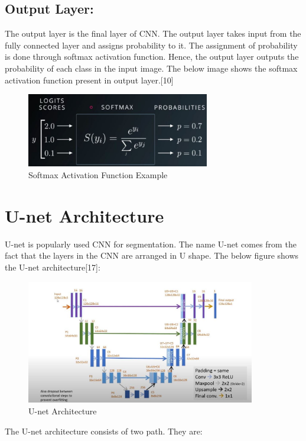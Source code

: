 \documentclass{IEEEtran}
\begin{document}
\subsection{\textbf{Output Layer:}}
The output layer is the final layer of CNN. The output layer takes input from the fully connected layer and assigns probability to it. The assignment of probability is done through softmax activation function. Hence, the output layer outputs the probability of each class in the input image. The below image shows the softmax activation function present in output layer.[10]

\begin{figure}[h]
    \centering
    \captionsetup{justification=centering}
    \includegraphics[width=8cm]{softmax}
    \caption{Softmax Activation Function Example}
    \label{fig:Softmax Activation Function Example}
\end{figure}
\newpage
\section{\textbf{U-net Architecture}}
U-net is popularly used CNN for segmentation. The name U-net comes from the fact that the layers in the CNN are arranged in U shape. The below figure shows the U-net architecture[17]:

\begin{figure}[h]
    \centering
    \captionsetup{justification=centering}
    \includegraphics[width=10cm]{u-net}
    \caption{U-net Architecture}
    \label{fig:U-net Architecture}
\end{figure}

The U-net architecture consists of two path. They are:\\
\end{document}

